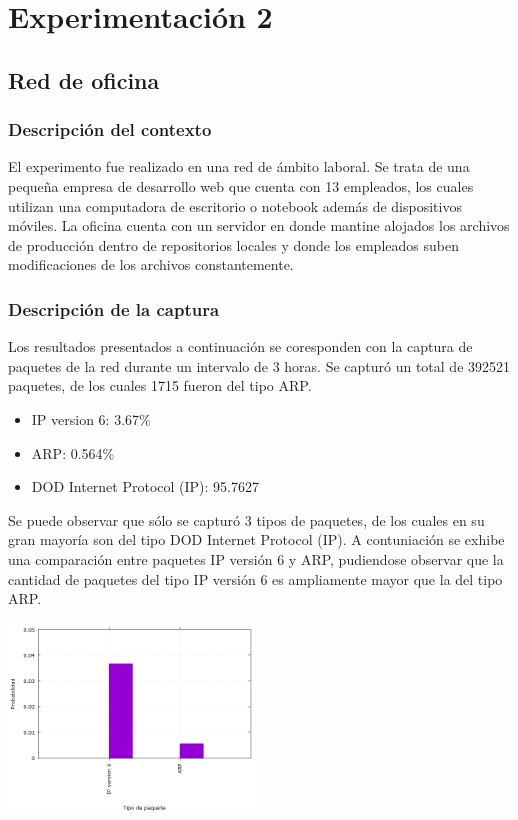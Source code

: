 \section{Experimentaci\'on 2}

\subsection{Red de oficina}

\subsubsection{Descripci\'on del contexto}
El experimento fue realizado en una red de ámbito laboral. Se trata de una pequeña empresa de desarrollo web que cuenta con 13 empleados, los cuales utilizan una computadora de escritorio o notebook además de dispositivos móviles. La oficina cuenta con un servidor en donde mantine alojados los archivos de producción dentro de repositorios locales y donde los empleados suben modificaciones de los archivos constantemente.

\subsubsection{Descripci\'on de la captura}
Los resultados presentados a continuación se coresponden con la captura de paquetes de la red durante un intervalo de 3 horas.
Se capturó un total de 392521 paquetes, de los cuales 1715 fueron del tipo ARP.
\begin{itemize}
\item IP version 6: 3.67\%
\item ARP: 0.564\%
\item DOD Internet Protocol (IP): 95.7627%
\end{itemize}
Se puede observar que sólo se capturó 3 tipos de paquetes, de los cuales en su gran mayoría son del tipo DOD Internet Protocol (IP).
A contuniación se exhibe una comparación entre paquetes IP versión 6 y ARP, pudiendose observar que la cantidad de paquetes del tipo IP versión 6 es ampliamente mayor que la del tipo ARP.
\begin{center}
\includegraphics[width=0.5\textwidth]{exp2-graficos/grafico1exp2.png}
\end{center}

